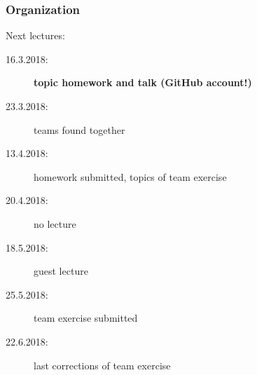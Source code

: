 

\date{16.3.2018}



\renewcommand{\enquote}[1]{\emph{``#1''}} %

\begin{frame}
	\titlepage
	\doclicenseThis
\end{frame}

\begin{frame}
	\frametitle{Organization}
	Next lectures:
	\begin{description}
		\item[16.3.2018:] \textbf{topic homework and talk (GitHub account!)}
		\item[23.3.2018:] teams found together
		\item[13.4.2018:] homework submitted, topics of team exercise
		\item[20.4.2018:] no lecture

		\item[18.5.2018:] guest lecture
		\item[25.5.2018:] team exercise submitted
		\item[22.6.2018:] last corrections of team exercise
	\end{description}
\end{frame}


